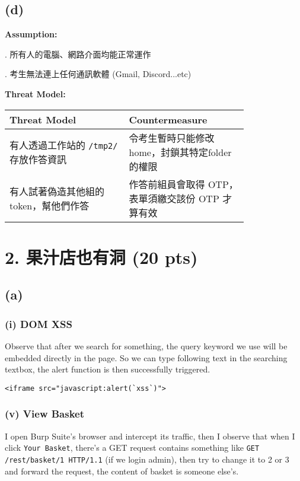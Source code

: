 \documentclass[12pt]{article}
\begin{document}
\subsection*{(d)}
\noindent \textbf{Assumption:}

. 所有人的電腦、網路介面均能正常運作

. 考生無法連上任何通訊軟體 (Gmail, Discord...etc)

\noindent \textbf{Threat Model:}

\begin{center}
\begin{tabular}{ |p{0.4\linewidth}|p{0.4\linewidth}| } 
 \hline
 Threat Model & Countermeasure \\
 \hline
 有人透過工作站的 \verb|/tmp2/| 存放作答資訊 & 令考生暫時只能修改home，封鎖其特定folder的權限 \\ 
 \hline
 有人試著偽造其他組的 token，幫他們作答 & 作答前組員會取得 OTP，表單須繳交該份 OTP 才算有效 \\ 
 \hline
\end{tabular}
\end{center}

\newpage
\section*{2. 果汁店也有洞 (20 pts)}
\subsection*{(a)}
\subsubsection*{(i) DOM XSS}
Observe that after we search for something, the query keyword we use will be embedded directly in the page. So we can type following text in the searching textbox, the alert function is then successfully triggered.
\begin{verbatim}
<iframe src="javascript:alert(`xss`)">
\end{verbatim}
\subsubsection*{(v) View Basket}
I open Burp Suite's browser and intercept its traffic, then I observe that when I click \texttt{Your Basket}, there's a GET request contains something like \texttt{GET /rest/basket/1 HTTP/1.1} (if we login admin), then try to change it to 2 or 3 and forward the request, the content of basket is someone else's.
\end{document}
